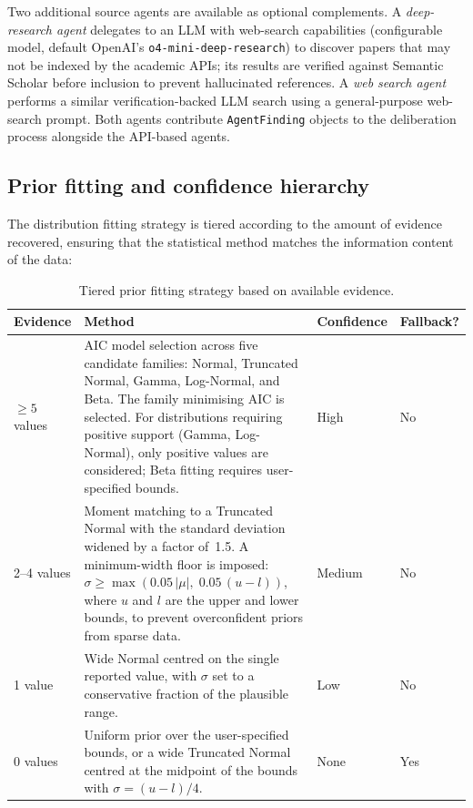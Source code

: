 \documentclass[11pt,a4paper]{article}
\begin{document}
Two additional source agents are available as optional complements. A \textit{deep-research agent} delegates to an LLM with web-search capabilities (configurable model, default OpenAI's \texttt{o4-mini-deep-research}) to discover papers that may not be indexed by the academic APIs; its results are verified against Semantic Scholar before inclusion to prevent hallucinated references. A \textit{web search agent} performs a similar verification-backed LLM search using a general-purpose web-search prompt. Both agents contribute \texttt{AgentFinding} objects to the deliberation process alongside the API-based agents.

\subsection{Prior fitting and confidence hierarchy}
\label{sec:confidence}

The distribution fitting strategy is tiered according to the amount of evidence recovered, ensuring that the statistical method matches the information content of the data:

\begin{table}[!htbp]
\centering
\caption{Tiered prior fitting strategy based on available evidence.}
\label{tab:confidence}
\small
\begin{tabularx}{\linewidth}{@{}l>{\raggedright\arraybackslash}Xll@{}}
  \toprule
  \textbf{Evidence} & \textbf{Method} & \textbf{Confidence} & \textbf{Fallback?} \\
  \midrule
  $\geq 5$ values & AIC model selection across five candidate families: Normal, Truncated Normal, Gamma, Log-Normal, and Beta. The family minimising AIC is selected. For distributions requiring positive support (Gamma, Log-Normal), only positive values are considered; Beta fitting requires user-specified bounds. & High & No \\[4pt]
  2--4 values & Moment matching to a Truncated Normal with the standard deviation widened by a factor of~1.5. A minimum-width floor is imposed: $\sigma \geq \max(0.05\,|\mu|,\; 0.05\,(u - l))$, where $u$ and $l$ are the upper and lower bounds, to prevent overconfident priors from sparse data. & Medium & No \\[4pt]
  1 value & Wide Normal centred on the single reported value, with $\sigma$ set to a conservative fraction of the plausible range. & Low & No \\[4pt]
  0 values & Uniform prior over the user-specified bounds, or a wide Truncated Normal centred at the midpoint of the bounds with $\sigma = (u - l)/4$. & None & Yes \\
  \bottomrule
\end{tabularx}
\end{table}
\end{document}

